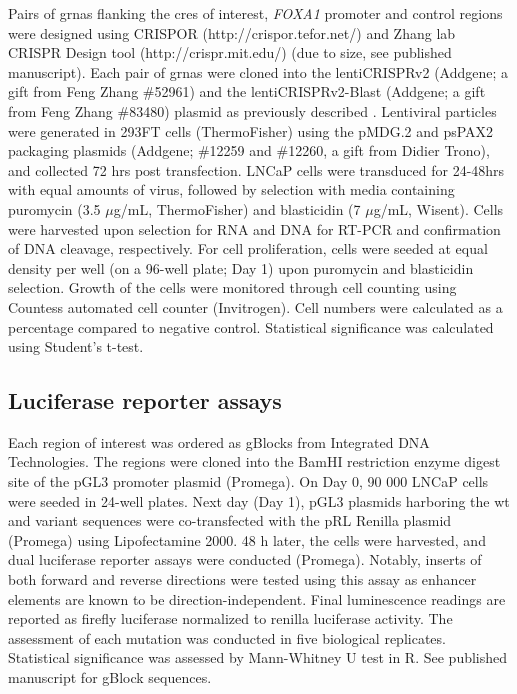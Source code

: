 Pairs of \glspl{grna} flanking the \glspl{cre} of interest, \emph{FOXA1} promoter and control regions were designed using CRISPOR (http://crispor.tefor.net/) and Zhang lab CRISPR Design tool (http://crispr.mit.edu/) (due to size, see published manuscript).
Each pair of \glspl{grna} were cloned into the lentiCRISPRv2 (Addgene; a gift from Feng Zhang \#52961) and the lentiCRISPRv2-Blast (Addgene; a gift from Feng Zhang \#83480) plasmid as previously described \cite{sanjanaImprovedVectorsGenomewide2014}.
Lentiviral particles were generated in 293FT cells (ThermoFisher) using the pMDG.2 and psPAX2 packaging plasmids (Addgene; \#12259 and \#12260, a gift from Didier Trono), and collected 72 hrs post transfection.
LNCaP cells were transduced for 24-48hrs with equal amounts of virus, followed by selection with media containing puromycin (3.5 $\mu$g/mL, ThermoFisher) and blasticidin (7 $\mu$g/mL, Wisent).
Cells were harvested upon selection for RNA and DNA for RT-PCR and confirmation of DNA cleavage, respectively.
For cell proliferation, cells were seeded at equal density per well (on a 96-well plate; Day 1) upon puromycin and blasticidin selection.
Growth of the cells were monitored through cell counting using Countess automated cell counter (Invitrogen).
Cell numbers were calculated as a percentage compared to negative control.
Statistical significance was calculated using Student's t-test.

\subsection{Luciferase reporter assays}

Each region of interest was ordered as gBlocks from Integrated DNA Technologies.
The regions were cloned into the BamHI restriction enzyme digest site of the pGL3 promoter plasmid (Promega).
On Day 0, 90 000 LNCaP cells were seeded in 24-well plates.
Next day (Day 1), pGL3 plasmids harboring the \gls{wt} and variant sequences were co-transfected with the pRL Renilla plasmid (Promega) using Lipofectamine 2000.
48 h later, the cells were harvested, and dual luciferase reporter assays were conducted (Promega).
Notably, inserts of both forward and reverse directions were tested using this assay as enhancer elements are known to be direction-independent.
Final luminescence readings are reported as firefly luciferase normalized to renilla luciferase activity.
The assessment of each mutation was conducted in five biological replicates.
Statistical significance was assessed by Mann-Whitney U test in R.
See published manuscript for gBlock sequences.

